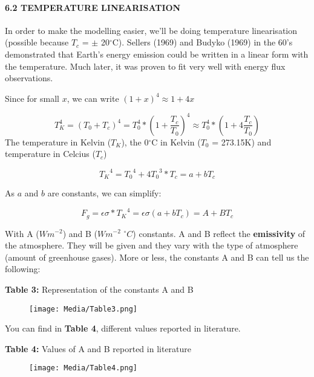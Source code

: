 \documentclass[
  letterpaper,
  DIV=11,
  numbers=noendperiod]{scrartcl}
\let\oldparagraph\paragraph
\renewcommand{\paragraph}[1]{\oldparagraph{#1}\mbox{}}
\begin{document}
\hypertarget{temperature-linearisation}{%
\paragraph{6.2 TEMPERATURE
LINEARISATION}\label{temperature-linearisation}}

In order to make the modelling easier, we'll be doing temperature
linearisation (possible because \(T_c\) = \(\pm\) 20\(^\circ\)C).
Sellers (1969) and Budyko (1969) in the 60's demonstrated that Earth's
energy emission could be written in a linear form with the temperature.
Much later, it was proven to fit very well with energy flux
observations.

Since for small \(x\), we can write \((1+x)^4 \approx 1 + 4x\)

\[T_K^4 = (T_0 + T_c)^4 = T_0^4 * (1 + \frac{T_c}{T_0})^4 \approx T_0^4 * (1+4\frac{T_c}{T_0})\]
The temperature in Kelvin (\(T_K\)), the 0\(^\circ\)C in Kelvin (\(T_0\)
= 273.15K) and temperature in Celcius (\(T_c\))

\[{T_K}^4 = {T_0}^4 + 4{T_0}^3 * T_c = a + bT_c\]

As \(a\) and \(b\) are constants, we can simplify:

\begin{equation}
\tag{6}
F_g = \epsilon\sigma * {T_K}^4 = \epsilon\sigma(a + bT_c) = A + BT_c
\end{equation}

With A (\(W m^{-2}\)) and B (\(W m^{-2}\) \(^\circ C\)) constants. A and
B reflect the \textbf{emissivity} of the atmosphere. They will be given
and they vary with the type of atmosphere (amount of greenhouse gases).
More or less, the constants A and B can tell us the following:

\textbf{Table 3:} Representation of the constants A and B

\begin{figure}

{\centering \texttt{[image: Media/Table3.png]}

}

\end{figure}

You can find in \textbf{Table 4}, different values reported in
literature.

\textbf{Table 4:} Values of A and B reported in literature

\begin{figure}

{\centering \texttt{[image: Media/Table4.png]}

}

\end{figure}
\end{document}
